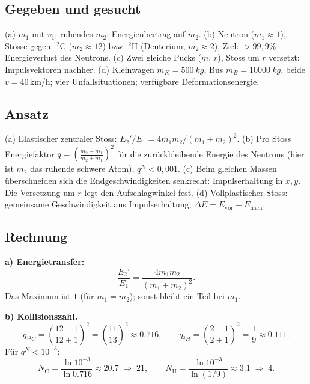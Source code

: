 
\subsection*{Gegeben und gesucht}
(a) $m_1$ mit $v_1$, ruhendes $m_2$: Energieübertrag auf $m_2$.
(b) Neutron ($m_1\approx 1$), Stösse gegen $^{12}\mathrm C$ ($m_2\approx 12$) bzw.
$^{2}\mathrm H$ (Deuterium, $m_2\approx 2$), Ziel: $>99{,}9\%$ Energieverlust des
Neutrons.
(c) Zwei gleiche Pucks ($m$, $r$), Stoss um $r$ versetzt: Impulsvektoren nachher.
(d) Kleinwagen $m_K=\qty{500}{kg}$, Bus $m_B=\qty{10000}{kg}$, beide $v=40$\,\unit{km/h};
vier Unfallsituationen; verfügbare Deformationsenergie.

\subsection*{Ansatz}
(a) Elastischer zentraler Stoss: $E_2'/E_1 = 4m_1m_2/(m_1+m_2)^2$.
(b) Pro Stoss Energiefaktor $q=\left(\frac{m_2-m_1}{m_2+m_1}\right)^2$ für die
zurückbleibende Energie des Neutrons (hier ist $m_2$ das ruhende schwere Atom),
$q^N<0{,}001$.
(c) Beim gleichen Massen überschneiden sich die Endgeschwindigkeiten senkrecht:
Impulserhaltung in $x,y$. Die Versetzung um $r$ legt den Aufschlagwinkel fest.
(d) Vollplastischer Stoss: gemeinsame Geschwindigkeit aus Impulserhaltung,
$\Delta E=E_\mathrm{vor}-E_\mathrm{nach}$.

\subsection*{Rechnung}
\textbf{a) Energietransfer:}
\begin{equation}
  \frac{E_2'}{E_1}
  = \frac{4m_1m_2}{(m_1+m_2)^2}.
\end{equation}
Das Maximum ist $1$ (für $m_1=m_2$); sonst bleibt ein Teil bei $m_1$.

\textbf{b) Kollisionszahl.}
\begin{equation}
  q_{^{12}C}=\left(\frac{12-1}{12+1}\right)^2=\left(\frac{11}{13}\right)^2\approx 0.716,
  \qquad
  q_{^{2}H}=\left(\frac{2-1}{2+1}\right)^2=\frac19\approx 0.111.
\end{equation}
Für $q^N<10^{-3}$:
\begin{equation}
  N_{\mathrm C}=\frac{\ln 10^{-3}}{\ln 0.716}\approx 20.7\;\Rightarrow\;21,
  \qquad
  N_{\mathrm H}=\frac{\ln 10^{-3}}{\ln(1/9)}\approx 3.1\;\Rightarrow\;4.
\end{equation}

